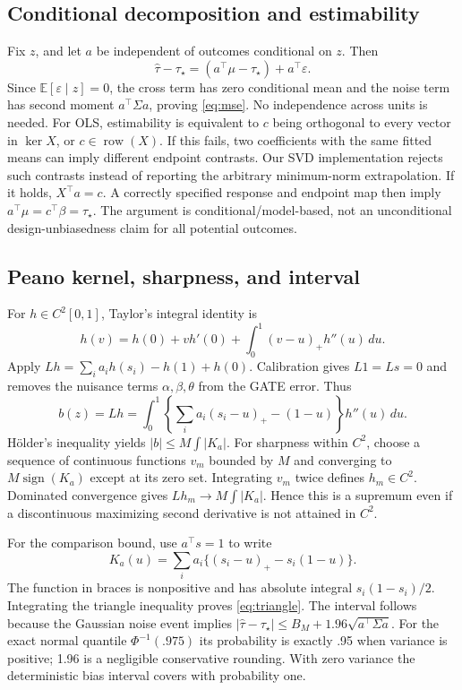 \documentclass{article}
\newcommand{\E}{\mathbb E}
\newcommand{\gate}{\tau_\star}
\begin{document}
\subsection{Conditional decomposition and estimability}
Fix $z$, and let $a$ be independent of outcomes conditional on $z$. Then
\[
\widehat\tau-\gate=(a^\top\mu-\gate)+a^\top\varepsilon.
\]
Since $\E[\varepsilon\mid z]=0$, the cross term has zero conditional mean and the noise term has second moment $a^\top\Sigma a$, proving \eqref{eq:mse}. No independence across units is needed. For OLS, estimability is equivalent to $c$ being orthogonal to every vector in $\ker X$, or $c\in\operatorname{row}(X)$. If this fails, two coefficients with the same fitted means can imply different endpoint contrasts. Our SVD implementation rejects such contrasts instead of reporting the arbitrary minimum-norm extrapolation. If it holds, $X^\top a=c$. A correctly specified response and endpoint map then imply $a^\top\mu=c^\top\beta=\gate$. The argument is conditional/model-based, not an unconditional design-unbiasedness claim for all potential outcomes.

\subsection{Peano kernel, sharpness, and interval}
For $h\in C^2[0,1]$, Taylor's integral identity is
\[
h(v)=h(0)+v h'(0)+\int_0^1(v-u)_+h''(u)\,du.
\]
Apply $Lh=\sum_i a_i h(s_i)-h(1)+h(0)$. Calibration gives $L1=Ls=0$ and removes the nuisance terms $\alpha,\beta,\theta$ from the GATE error. Thus
\[
b(z)=Lh=\int_0^1\left\{\sum_i a_i(s_i-u)_+-(1-u)\right\}h''(u)\,du.
\]
H\"older's inequality yields $|b|\le M\int|K_a|$. For sharpness within $C^2$, choose a sequence of continuous functions $v_m$ bounded by $M$ and converging to $M\operatorname{sign}(K_a)$ except at its zero set. Integrating $v_m$ twice defines $h_m\in C^2$. Dominated convergence gives $Lh_m\to M\int|K_a|$. Hence this is a supremum even if a discontinuous maximizing second derivative is not attained in $C^2$.

For the comparison bound, use $a^\top s=1$ to write
\[
K_a(u)=\sum_i a_i\{(s_i-u)_+-s_i(1-u)\}.
\]
The function in braces is nonpositive and has absolute integral $s_i(1-s_i)/2$. Integrating the triangle inequality proves \eqref{eq:triangle}. The interval follows because the Gaussian noise event implies
$|\widehat\tau-\gate|\le B_M+1.96\sqrt{a^\top\Sigma a}$. For the exact normal quantile $\Phi^{-1}(.975)$ its probability is exactly .95 when variance is positive; 1.96 is a negligible conservative rounding. With zero variance the deterministic bias interval covers with probability one.
\end{document}

